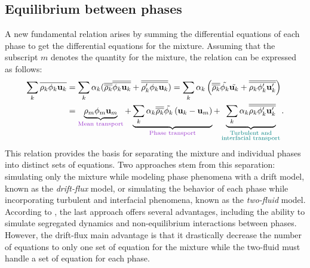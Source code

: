 \subsection{Equilibrium between phases}

A new fundamental relation arises by summing the differential equations of each phase to get the differential equations for the mixture. Assuming that the subscript $m$ denotes the quantity for the mixture, the relation can be expressed as follows:
\begin{equation}\label{mixtureeq}
  \begin{aligned}
   \sum_k \overline{\rho_k \phi_k \mathbf{u}_k} &= \sum_k \alpha_k(\overline{\overline{\rho_k}}\overline{\overline{\phi_k \mathbf{u}_k}}+\overline{\overline{\rho_k' \phi_k \mathbf{u}_k}}) = \sum_k \alpha_k\parent{\overline{\overline{\rho_k}}\tilde{\phi_k} \tilde{\mathbf{u}_k}+\overline{\overline{\rho_k \phi_k' \mathbf{u}_k'}}}\\ &=\underbrace{\rho_m\phi_m \mathbf{u}_m}_{\color{mydarkorchid}\text{Mean transport}} + \underbrace{\sum_k\alpha_k\overline{\overline{\rho_k}}\tilde{\phi_k}\parent{\mathbf{u}_k-\mathbf{u}_m}}_{\color{mydarkorchid}\text{Phase transport}} + \underbrace{\sum_k\alpha_k\overline{\overline{\rho_k\phi_k'\mathbf{u}_k'}}}_{\color{myteal}\substack{\text{Turbulent and}\\\text{interfacial transport}}}.
   \end{aligned}
\end{equation}
This relation provides the basis for separating the mixture and individual phases into distinct sets of equations. Two approaches stem from this separation: simulating only the mixture while modeling phase phenomena with a drift model, known as the \emph{drift-flux} model, or simulating the behavior of each phase while incorporating turbulent and interfacial phenomena, known as the \emph{two-fluid} model. According to \cite{LivreIH}, the last approach offers several advantages, including the ability to simulate segregated dynamics and non-equilibrium interactions between phases. However, the drift-flux main advantage is that it drastically decrease the number of equations to only one set of equation for the mixture while the two-fluid must handle a set of equation for each phase.

